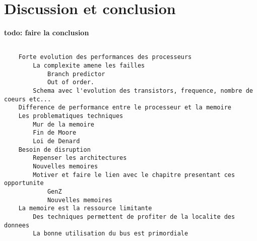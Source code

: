 \section{Discussion et conclusion}\label{sec:materiel_conclusion}


\textbf{todo: faire la conclusion}


    \begin{lstlisting}
    
	Forte evolution des performances des processeurs
		La complexite amene les failles
			Branch predictor
			Out of order.
		Schema avec l'evolution des transistors, frequence, nombre de coeurs etc...
	Difference de performance entre le processeur et la memoire
	Les problematiques techniques
		Mur de la memoire
		Fin de Moore
		Loi de Denard
	Besoin de disruption
		Repenser les architectures
		Nouvelles memoires
		Motiver et faire le lien avec le chapitre presentant ces opportunite
			GenZ
			Nouvelles memoires
    La memoire est la ressource limitante
		Des techniques permettent de profiter de la localite des donnees
		La bonne utilisation du bus est primordiale

	\end{lstlisting}
	
	
	